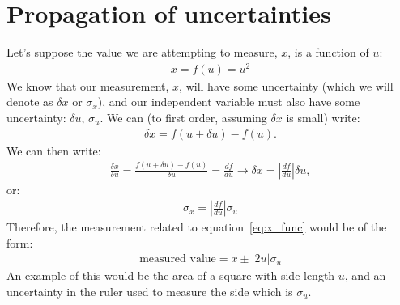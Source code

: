 \documentclass{article}
\begin{document}
\section{Propagation of uncertainties}
Let's suppose the value we are attempting to measure, $x$, is a function of $u$:
\begin{align}
  x = f(u) = u^2
  \label{eq:x_func}
\end{align}
We know that our measurement, $x$, will have some uncertainty (which we will denote as $\delta x$ or $\sigma_x$), and our independent variable must also have some uncertainty: $\delta u,\,\sigma_u$. We can (to first order, assuming $\delta x$ is small) write:
\begin{align}
  \delta x = f(u+\delta u) - f(u).
\end{align}
We can then write:
\begin{align}
  \frac{\delta x}{\delta u} = \frac{f(u+\delta u) - f(u)}{\delta u} = \frac{df}{du}\rightarrow \delta x = \left|\frac{df}{du}\right|\delta u,
\end{align}
or:
\begin{align}
  \sigma_x = \left|\frac{df}{du}\right|\sigma_u
\end{align}
Therefore, the measurement related to equation~\ref{eq:x_func} would be of the form:
\begin{align}
  \text{measured value} = x\pm|2u|\sigma_u
\end{align}
An example of this would be the area of a square with side length $u$, and an uncertainty in the ruler used to measure the side which is $\sigma_u$. 
\end{document}

